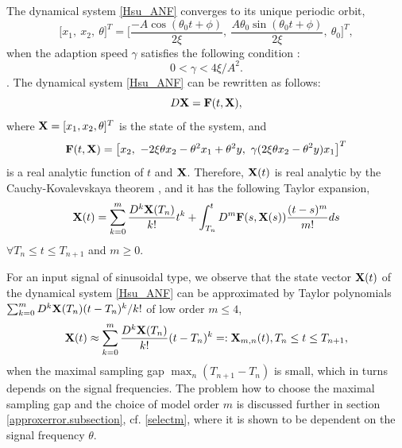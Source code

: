 \documentclass{UCF_ETD}
\begin{document}
 The dynamical
system \eqref{Hsu_ANF}
 converges to its
unique periodic orbit,
\begin{equation}  \label{Hsu_Orbit}
\big [x_1,\ x_2,\ \theta\big ]^T = \Big[ \frac{-A\cos(\theta_0 t + \phi)}{2\xi },\ \frac{A \theta_0 \sin(\theta_0 t + \phi)}{2\xi }, \ \theta_0 \Big]^T,
\end{equation}
 when the adaption speed $\gamma$ satisfies the following condition \cite{hsuortegadamm99}:
  \begin{equation}\label{Hsu.condition}
  0<\gamma<{4\xi}/{A^2}. \end{equation}
. %
  The dynamical
 system \eqref{Hsu_ANF} can be rewritten as follows: %
\begin{equation} \label{CauchyKowalevskaya}
D{\bf X} = {\bf F}(t,{\bf X}),  %
\end{equation}
where  ${\bf X}=[x_1, x_2,\theta]^T$ is the state of the system, and
$$ {\bf F}(t, {\bf X}) =
\big[
    x_2, \    -2\xi\theta x_2 -{\theta}^2x_1+{\theta}^2y, \
    \gamma ({2\xi \theta x_2 - \theta}^2y )x_1
\big]^T$$
 is  a real analytic function of $t$ and ${\bf X}$.
Therefore, ${\bf X}(t)$ is real analytic by the  Cauchy-Kovalevskaya theorem  \cite[Theorem 2 of Chapter 4]{evans98}, and it has the following Taylor expansion,  %
 \begin{equation} \label{xtapproximation0}
 {\bf X}(t) = \sum_{k=0}^m \frac{D^k {\bf X}(T_n)}{k!} t^k +\int_{T_n}^t D^m{\bf F}(s, {\bf X}(s)) \frac{(t-s)^m}{m!} ds
 \end{equation}
 $\forall T_n\le  t\le T_{n+1}$ and  $m\ge 0$.


For  an input signal  of sinusoidal type, we observe that
the state vector ${\bf X}(t)$ of
the dynamical system %
 \eqref{Hsu_ANF} can be approximated by
Taylor polynomials $\sum_{k=0}^m D^k {\bf X}(T_n) (t-T_n)^k/k!$ of low order $m\le 4$,
 \begin{equation}\label{xtapproximation}
 {\bf X}(t)\approx \sum_{k=0}^m \frac{D^k {\bf X}(T_n)}{k!} (t-T_n)^k=:{\bf X}_{m, n}(t), T_n\le t\le T_{n+1},
 \end{equation}
 when the maximal sampling gap $\max_n (T_{n+1}-T_n)$ is small, which in turns depends on the signal frequencies.  The problem how to
 choose %
 the maximal sampling gap and the choice of model order $m$ is discussed further in section \ref{approxerror.subsection}, cf. \eqref{selectm}, where it is shown to be dependent on the signal frequency $\theta$. %
\end{document}
